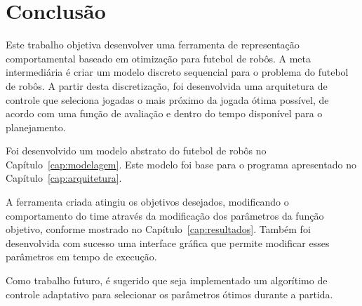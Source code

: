 \chapter*{Conclusão}\label{cap:conclusao}

Este trabalho objetiva desenvolver uma ferramenta de representação
comportamental baseado em otimização para futebol de robôs.
A meta intermediária é criar um modelo discreto sequencial
para o problema do futebol de robôs. A partir desta
discretização, foi desenvolvida uma arquitetura de controle
que seleciona jogadas o mais próximo da jogada ótima possível,
de acordo com uma função de avaliação e dentro do tempo disponível
para o planejamento.

Foi desenvolvido um modelo abstrato do futebol de robôs no
Capítulo~\ref{cap:modelagem}. Este modelo foi base para o
programa apresentado no Capítulo~\ref{cap:arquitetura}.

A ferramenta criada atingiu os objetivos desejados, modificando o
comportamento do time através da modificação dos parâmetros da função
objetivo, conforme mostrado no Capítulo~\ref{cap:resultados}. Também foi
desenvolvida com sucesso uma interface gráfica que permite modificar
esses parâmetros em tempo de execução.

Como trabalho futuro, é sugerido que seja implementado 
um algorítimo de controle adaptativo para selecionar os
parâmetros ótimos durante a partida.

